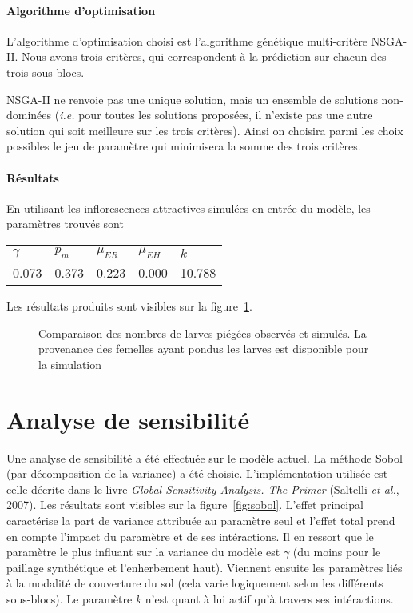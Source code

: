 \documentclass[a4paper, 11pt]{article}
\begin{document}
\paragraph{Algorithme d'optimisation} L'algorithme d'optimisation choisi est l'algorithme génétique multi-critère NSGA-II. Nous avons trois critères, qui correspondent à la prédiction sur chacun des trois sous-blocs.

NSGA-II ne renvoie pas une unique solution, mais un ensemble de solutions non-dominées (\textit{i.e.} pour toutes les solutions proposées, il n'existe pas une autre solution qui soit meilleure sur les trois critères). Ainsi on choisira parmi les choix possibles le jeu de paramètre qui minimisera la somme des trois critères.


\paragraph{Résultats} En utilisant les inflorescences attractives simulées en entrée du modèle, les paramètres trouvés sont
\begin{center}
\begin{tabular}{lllll}
$\gamma$ & $p_m$ & $\mu_{ER}$ & $\mu_{EH}$ & $k$\\
0.073 & 0.373 & 0.223 & 0.000 & 10.788
\end{tabular}
\end{center}

Les résultats produits sont visibles sur la figure~\ref{fig:dyn}.

\begin{figure}[ht]
\centering
 \caption{Comparaison des nombres de larves piégées observés et simulés. La provenance des femelles ayant pondus les larves est disponible pour la simulation}
 \label{fig:dyn}
\end{figure}




\section{Analyse de sensibilité}



Une analyse de sensibilité a été effectuée sur le modèle actuel. La méthode Sobol (par décomposition de la variance) a été choisie. L'implémentation utilisée est celle décrite dans le livre \textit{Global Sensitivity Analysis. The Primer} (Saltelli \textit{et al.}, 2007). Les résultats sont visibles sur la figure~\ref{fig:sobol}. L'effet principal caractérise la part de variance attribuée au paramètre seul et l'effet total prend en compte l'impact du paramètre et de ses intéractions. Il en ressort que le paramètre le plus influant sur la variance du modèle est $\gamma$ (du moins pour le paillage synthétique et l'enherbement haut). Viennent ensuite les paramètres liés à la modalité de couverture du sol (cela varie logiquement selon les différents sous-blocs). Le paramètre $k$ n'est quant à lui actif qu'à travers ses intéractions.
\end{document}
